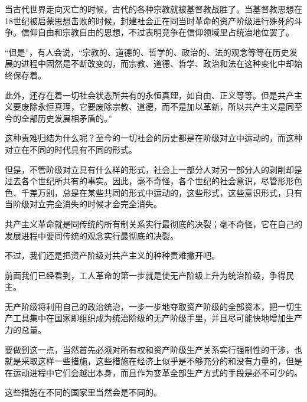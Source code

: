 \documentclass[10pt, UTF8]{book} %
\begin{document}
当古代世界走向灭亡的时候，古代的各种宗教就被基督教战胜了。当基督教思想在18世纪被启蒙思想击败的时候，封建社会正在同当时革命的资产阶级进行殊死的斗争。信仰自由和宗教自由的思想，不过表明竞争在信仰领域里占统治地位罢了。

“但是”，有人会说，“宗教的、道德的、哲学的、政治的、法的观念等等在历史发展的进程中固然是不断改变的，而宗教、道德、哲学、政治和法在这种变化中却始终保存着。

此外，还存在着一切社会状态所共有的永恒真理，如自由、正义等等。但是共产主义要废除永恒真理，它要废除宗教、道德，而不是加以革新，所以共产主义是同至今的全部历史发展相矛盾的。”

这种责难归结为什么呢？至今的一切社会的历史都是在阶级对立中运动的，而这种对立在不同的时代具有不同的形式。

但是，不管阶级对立具有什么样的形式，社会上一部分人对另一部分人的剥削却是过去各个世纪所共有的事实。因此，毫不奇怪，各个世纪的社会意识，尽管形形色色、千差万别，总是在某些共同的形式中运动的，这些形式，这些意识形式，只有当阶级对立完全消失的时候才会完全消失。

共产主义革命就是同传统的所有制关系实行最彻底的决裂；毫不奇怪，它在自己的发展进程中要同传统的观念实行最彻底的决裂。

不过，我们还是把资产阶级对共产主义的种种责难撇开吧。

前面我们已经看到，工人革命的第一步就是使无产阶级上升为统治阶级，争得民主。

无产阶级将利用自己的政治统治，一步一步地夺取资产阶级的全部资本，把一切生产工具集中在国家即组织成为统治阶级的无产阶级手里，并且尽可能快地增加生产力的总量。

要做到这一点，当然首先必须对所有权和资产阶级生产关系实行强制性的干涉，也就是采取这样一些措施，这些措施在经济上似乎是不够充分的和没有力量的，但是在运动进程中它们会越出本身，而且作为变革全部生产方式的手段是必不可少的。

这些措施在不同的国家里当然会是不同的。
\end{document}
